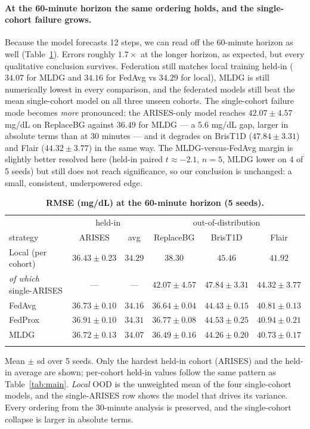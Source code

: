\documentclass[10pt,letterpaper]{article}
\newlength\savedwidth
\newcommand\thickhline{\noalign{\global\savedwidth\arrayrulewidth\global\arrayrulewidth 2pt}%
\hline
\noalign{\global\arrayrulewidth\savedwidth}}
\begin{document}
\paragraph{At the 60-minute horizon the same ordering holds, and the
single-cohort failure grows.} Because the model forecasts 12 steps, we can read
off the 60-minute horizon as well (Table~\ref{tab:h60}). Errors roughly
$1.7\times$ at the longer horizon, as expected, but every qualitative conclusion
survives. Federation still matches local training held-in ($34.07$ for MLDG and
$34.16$ for FedAvg vs $34.29$ for local), MLDG is still numerically lowest in
every comparison, and the federated models still beat the mean single-cohort model
on all three unseen cohorts. The single-cohort failure mode becomes \emph{more}
pronounced: the ARISES-only model reaches $42.07 \pm 4.57$ mg/dL on ReplaceBG
against $36.49$ for MLDG --- a $5.6$ mg/dL gap, larger in absolute terms than at
30 minutes --- and it degrades on BrisT1D ($47.84 \pm 3.31$) and Flair
($44.32 \pm 3.77$) in the same way. The MLDG-versus-FedAvg margin is slightly
better resolved here (held-in paired $t \approx -2.1$, $n=5$, MLDG lower on 4 of 5
seeds) but still does not reach significance, so our conclusion is unchanged: a
small, consistent, underpowered edge.

\begin{table}[!ht]
\centering
\captionsetup{justification=centering,singlelinecheck=on}
\caption{\bf RMSE (mg/dL) at the 60-minute horizon (5 seeds).}
\label{tab:h60}
\begin{tabular}{lccccc}
\thickhline
 & \multicolumn{2}{c}{held-in} & \multicolumn{3}{c}{out-of-distribution} \\
strategy & ARISES & avg & ReplaceBG & BrisT1D & Flair \\
\hline
Local (per cohort) & $36.43 \pm 0.23$ & $34.29$ & $38.30$ & $45.46$ & $41.92$ \\
\;\emph{of which} single-ARISES & --- & --- & $42.07 \pm 4.57$ & $47.84 \pm 3.31$ & $44.32 \pm 3.77$ \\
\hline
FedAvg  & $36.73 \pm 0.10$ & $34.16$ & $36.64 \pm 0.04$ & $44.43 \pm 0.15$ & $40.81 \pm 0.13$ \\
FedProx & $36.91 \pm 0.10$ & $34.31$ & $36.77 \pm 0.08$ & $44.53 \pm 0.25$ & $40.94 \pm 0.21$ \\
MLDG    & $36.72 \pm 0.13$ & $\mathbf{34.07}$ & $\mathbf{36.49 \pm 0.16}$ & $\mathbf{44.26 \pm 0.20}$ & $\mathbf{40.73 \pm 0.17}$ \\
\thickhline
\end{tabular}
\begin{center}
{\small Mean $\pm$ sd over 5 seeds. Only the hardest held-in cohort (ARISES) and
the held-in average are shown; per-cohort held-in values follow the same pattern
as Table~\ref{tab:main}. \emph{Local} OOD is the unweighted mean of the four
single-cohort models, and the single-ARISES row shows the model that drives its
variance. Every ordering from the 30-minute analysis is preserved, and the
single-cohort collapse is larger in absolute terms.}
\end{center}
\end{table}
\end{document}
